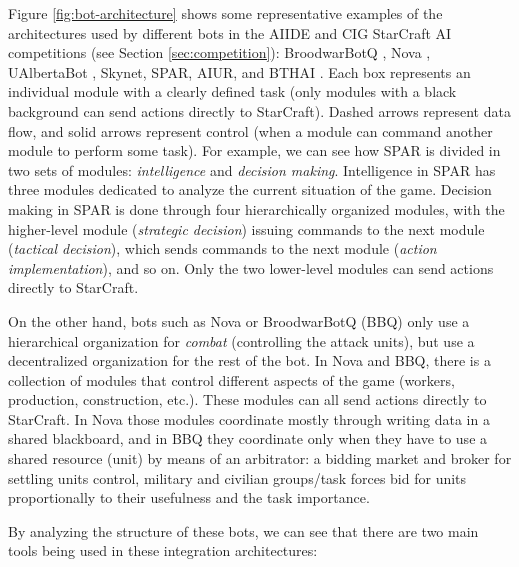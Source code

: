 \documentclass[journal]{IEEEtran}
\begin{document}
Figure \ref{fig:bot-architecture} shows some representative examples of the architectures used by different bots in the AIIDE and CIG StarCraft AI competitions (see Section \ref{sec:competition}): BroodwarBotQ \cite{SynnaeveMicroCig11}, Nova \cite{uriarte2012kiting}, UAlbertaBot \cite{churchill2011build}, Skynet, SPAR, AIUR, and BTHAI \cite{Hagelback12}. Each box represents an individual module with a clearly defined task (only modules with a black background can send actions directly to StarCraft). Dashed arrows represent data flow, and solid arrows represent control (when a module can command another module to perform some task). For example, we can see how SPAR is divided in two sets of modules: {\em intelligence} and {\em decision making}. Intelligence in SPAR has three modules dedicated to analyze the current situation of the game. Decision making in SPAR is done through four hierarchically organized modules, with the higher-level module ({\em strategic decision}) issuing commands to the next module ({\em tactical decision}), which sends commands to the next module ({\em action implementation}), and so on. Only the two lower-level modules can send actions directly to StarCraft. 

On the other hand, bots such as Nova or BroodwarBotQ (BBQ) only use a hierarchical organization for {\em combat} (controlling the attack units), but use a decentralized organization for the rest of the bot. In Nova and BBQ, there is a collection of modules that control different aspects of the game (workers, production, construction, etc.). These modules can all send actions directly to StarCraft. In Nova those modules coordinate mostly through writing data in a shared blackboard, and in BBQ they coordinate only when they have to use a shared resource (unit) by means of an arbitrator: a bidding market and broker for settling units control, military and civilian groups/task forces bid for units proportionally to their usefulness and the task importance.

By analyzing the structure of these bots, we can see that there are two main tools being used in these integration architectures:
\end{document}
